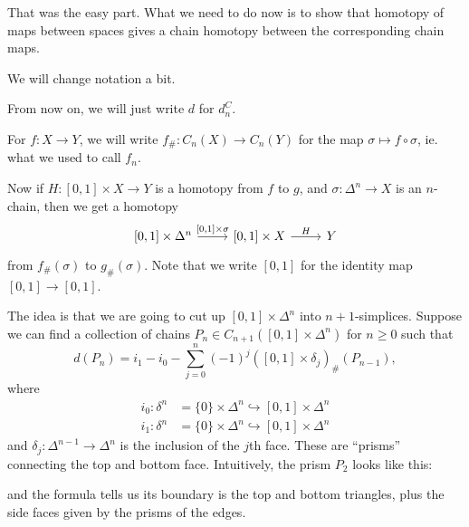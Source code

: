 \documentclass[a4paper]{article}
\begin{document}
That was the easy part. What we need to do now is to show that homotopy of maps between spaces gives a chain homotopy between the corresponding chain maps.

We will change notation a bit.
\begin{notation}
  From now on, we will just write $d$ for $d_n^C$.

  For $f: X \to Y$, we will write $f_\#: C_n(X) \to C_n(Y)$ for the map $\sigma \mapsto f \circ \sigma$, ie. what we used to call $f_n$.
\end{notation}

Now if $H: [0, 1] \times X \to Y$ is a homotopy from $f$ to $g$, and $\sigma: \Delta^n \to X$ is an $n$-chain, then we get a homotopy
\[
  \begin{tikzcd}
    \lbrack0, 1\rbrack \times \Delta^n \ar[r, "{[0, 1] \times \sigma}"] & \lbrack0, 1\rbrack \times X \ar[r, "H"] & Y
  \end{tikzcd}
\]
from $f_\#(\sigma)$ to $g_\#(\sigma)$. Note that we write $[0, 1]$ for the identity map $[0, 1] \to [0, 1]$.

The idea is that we are going to cut up $[0, 1] \times \Delta^n$ into $n + 1$-simplices. Suppose we can find a collection of chains $P_n \in C_{n + 1}([0, 1] \times \Delta^n)$ for $n \geq 0$ such that
\[
  d(P_n) = i_1 - i_0 - \sum_{j = 0}^n (-1)^j ([0, 1] \times \delta_j)_\#(P_{n - 1}),
\]
where
\begin{align*}
  i_0: \delta^n &= \{0\} \times \Delta^n \hookrightarrow [0, 1] \times \Delta^n\\
  i_1: \delta^n &= \{0\} \times \Delta^n \hookrightarrow [0, 1] \times \Delta^n
\end{align*}
and $\delta_j: \Delta^{n - 1} \to \Delta^n$ is the inclusion of the $j$th face. These are ``prisms'' connecting the top and bottom face. Intuitively, the prism $P_2$ looks like this:
\begin{center}
\end{center}
and the formula tells us its boundary is the top and bottom triangles, plus the side faces given by the prisms of the edges.
\end{document}

